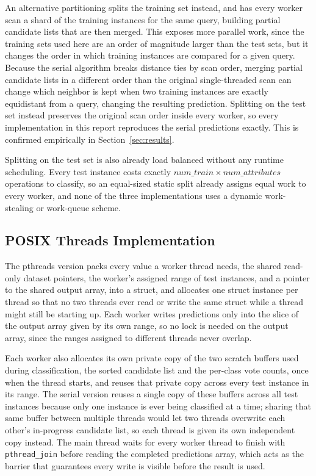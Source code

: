 \documentclass[conference]{IEEEtran}
\begin{document}
An alternative partitioning splits the training set instead, and has every
worker scan a shard of the training instances for the same query,
building partial candidate lists that are then merged. This exposes more
parallel work, since the training sets used here are an order of magnitude
larger than the test sets, but it changes the order in which training
instances are compared for a given query. Because the serial algorithm
breaks distance ties by scan order, merging partial candidate lists in a
different order than the original single-threaded scan can change which
neighbor is kept when two training instances are exactly equidistant from
a query, changing the resulting prediction. Splitting on the test set
instead preserves the original scan order inside every worker, so every
implementation in this report reproduces the serial predictions exactly.
This is confirmed empirically in Section~\ref{sec:results}.

Splitting on the test set is also already load balanced without any
runtime scheduling. Every test instance costs exactly
$\mathit{num\_train} \times \mathit{num\_attributes}$ operations to
classify, so an equal-sized static split already assigns equal work to
every worker, and none of the three implementations uses a dynamic
work-stealing or work-queue scheme.

\subsection{POSIX Threads Implementation}

The pthreads version packs every value a worker thread needs, the shared
read-only dataset pointers, the worker's assigned range of test instances,
and a pointer to the shared output array, into a struct, and allocates one
struct instance per thread so that no two threads ever read or write the
same struct while a thread might still be starting up. Each worker writes
predictions only into the slice of the output array given by its own
range, so no lock is needed on the output array, since the ranges assigned
to different threads never overlap.

Each worker also allocates its own private copy of the two scratch
buffers used during classification, the sorted candidate list and the
per-class vote counts, once when the thread starts, and reuses that
private copy across every test instance in its range. The serial version
reuses a single copy of these buffers across all test instances because
only one instance is ever being classified at a time; sharing that same
buffer between multiple threads would let two threads overwrite each
other's in-progress candidate list, so each thread is given its own
independent copy instead. The main thread waits for every worker thread to
finish with \texttt{pthread\_join} before reading the completed
predictions array, which acts as the barrier that guarantees every write
is visible before the result is used.
\end{document}

